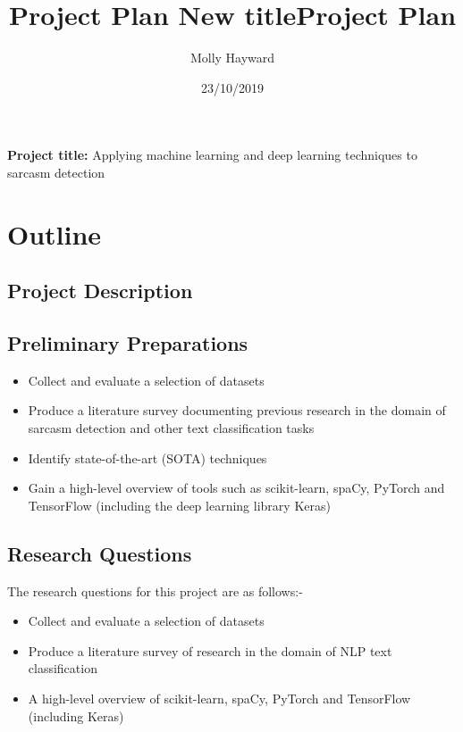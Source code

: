 \documentclass[12pt,a4paper]{article}
\title{Project Plan \large \newline 
New title}
\title{Project Plan}
\author{Molly Hayward}
\date{23/10/2019}
\begin{document}
\maketitle

\begin{center}
	\textbf{Project title:} Applying machine learning and deep learning techniques to sarcasm detection
\end{center}


\section{Outline}
\subsection{Project Description}


\subsection{Preliminary Preparations}
\begin{itemize}
	\setlength\itemsep{0em}
	\item Collect and evaluate a selection of datasets
	\item Produce a literature survey documenting previous research in the domain of sarcasm detection and other text classification tasks
	\item Identify state-of-the-art (SOTA) techniques
	\item Gain a high-level overview of tools such as scikit-learn, spaCy, PyTorch and TensorFlow (including the deep learning library Keras)
\end{itemize}



\subsection{Research Questions}
The research questions for this project are as follows:-
\begin{itemize}
	\setlength\itemsep{0em}
	\item Collect and evaluate a selection of datasets
	\item Produce a literature survey of research in the domain of NLP text classification
	\item A high-level overview of scikit-learn, spaCy, PyTorch and TensorFlow (including Keras)
\end{itemize}
\end{document}
